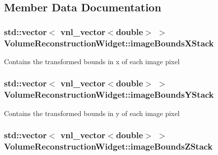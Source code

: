 \subsection{Member Data Documentation}
\hypertarget{class_volume_reconstruction_widget_ac955dfda26333bae884d4dbe1f60a4da}{
\subsubsection[{image\-Bounds\-X\-Stack}]{\setlength{\rightskip}{0pt plus 5cm}std\-::vector$<$ vnl\-\_\-vector$<$double$>$ $>$ {\bf Volume\-Reconstruction\-Widget\-::image\-Bounds\-X\-Stack}}}\label{d5/d55/class_volume_reconstruction_widget_ac955dfda26333bae884d4dbe1f60a4da}
Contains the transformed bounds in x of each image pixel \hypertarget{class_volume_reconstruction_widget_a4d5b04312c40280d1b32bd51f65d38b7}{
\subsubsection[{image\-Bounds\-Y\-Stack}]{\setlength{\rightskip}{0pt plus 5cm}std\-::vector$<$ vnl\-\_\-vector$<$double$>$ $>$ {\bf Volume\-Reconstruction\-Widget\-::image\-Bounds\-Y\-Stack}}}\label{d5/d55/class_volume_reconstruction_widget_a4d5b04312c40280d1b32bd51f65d38b7}
Contains the transformed bounds in y of each image pixel \hypertarget{class_volume_reconstruction_widget_a016899517e376967dd75c268c0e4d81c}{
\subsubsection[{image\-Bounds\-Z\-Stack}]{\setlength{\rightskip}{0pt plus 5cm}std\-::vector$<$ vnl\-\_\-vector$<$double$>$ $>$ {\bf Volume\-Reconstruction\-Widget\-::image\-Bounds\-Z\-Stack}}}\label{d5/d55/class_volume_reconstruction_widget_a016899517e376967dd75c268c0e4d81c}
